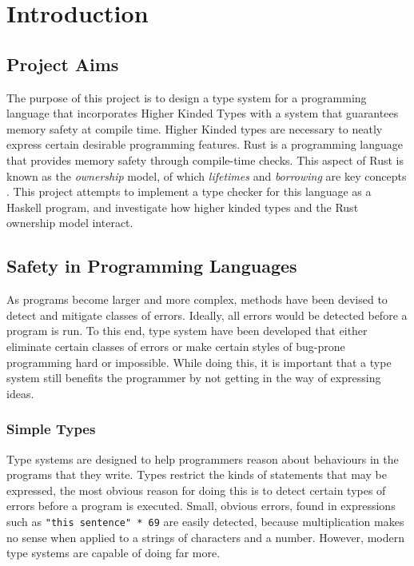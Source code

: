 \chapter{Introduction}\label{sec:intro}

\section{Project Aims}
The purpose of this project is to design a type system for a programming
language that incorporates Higher Kinded Types with a system that guarantees
memory safety at compile time. Higher Kinded types are necessary to neatly
express certain desirable programming features. Rust is a programming language
that provides memory safety through compile-time checks. This aspect of Rust is
known as the \textit{ownership} model, of which \textit{lifetimes} and
\textit{borrowing} are key concepts \cite{rust}. This project attempts to
implement a type checker for this language as a Haskell program, and
investigate how higher kinded types and the Rust ownership model interact.

\section{Safety in Programming Languages}
As programs become larger and more complex, methods have been devised to detect
and mitigate classes of errors. Ideally, all errors would be detected before a
program is run. To this end, type system have been developed that either
eliminate certain classes of errors or make certain styles of bug-prone
programming hard or impossible. While doing this, it is important that a type
system still benefits the programmer by not getting in the way of expressing
ideas.

\subsection{Simple Types}
Type systems are designed to help programmers reason about behaviours in the
programs that they write. Types restrict the kinds of statements that may be
expressed, the most obvious reason for doing this is to detect certain types of
errors before a program is executed. Small, obvious errors, found in
expressions such as \lstinline{"this sentence" * 69} are easily detected,
because multiplication makes no sense when applied to a strings of characters
and a number.  However, modern type systems are capable of doing far more. 

